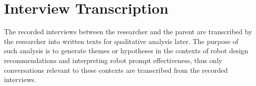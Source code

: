 \section{Interview Transcription}
The recorded interviews between the researcher and the parent are transcribed by the researcher into written texts for qualitative analysis later.  The purpose of such analysis is to generate themes or hypotheses in the contexts of robot design recommendations and interpreting robot prompt effectiveness, thus only conversations relevant to these contexts are transcribed from the recorded interviews.